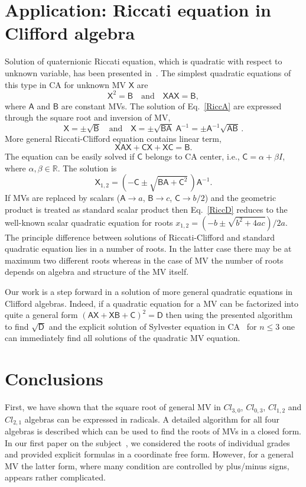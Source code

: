 \documentclass{birkjour}
\newcommand{\cl}[2]{\ensuremath{\mathit{Cl}_{#1,#2}}}
\newcommand{\bbR}{\ensuremath{\mathbb{R}}}
\def\A{\mathsf{A}}
\def\B{\mathsf{B}}
\def\C{\mathsf{C}}
\def\D{\mathsf{D}}
\def\X{\mathsf{X}}
\begin{document}
\section{Application: Riccati equation in Clifford algebra\label{sec:application}}
Solution of quaternionic Riccati equation, which is quadratic with
respect to unknown variable, has been presented
in~\cite{Janovska13}. The simplest quadratic equations of this
type in CA for unknown MV $\X$ are
\begin{equation}\label{RiccA}
\X^2=\B\quad\text{and}\quad\X\A\X=\B,
\end{equation}
where $\A$ and $\B$ are constant MVs. The solution of
Eq.~\eqref{RiccA} are expressed through the square root and
inversion of MV,
\begin{equation}\label{RiccB}
\X=\pm\sqrt{\B}\quad\text{and}\quad\X=\pm\sqrt{\B\A}\;\A^{-1}=\pm\A^{-1}\sqrt{\A\B}\,.
\end{equation}
More general Riccati-Clifford equation contains linear term,
\begin{equation}\label{RiccC}
\X\A\X+\C\X+\X\C=\B.
\end{equation}
The equation can be easily solved if $\C$ belongs to CA center,
i.e., $\C=\alpha+\beta I$, where $\alpha,\beta\in\bbR$. The
solution is~\cite{Dargys2019}
\begin{equation}\label{RiccD}
\X_{1,2}=(-\C\pm\sqrt{\B\A+\C^2}\,)\A^{-1}.
\end{equation}
If MVs are replaced by scalars ($\A\to a$, $\B\to c$, $\C\to b/2$)
and the geometric product is treated as standard scalar product
then Eq.~\eqref{RiccD} reduces to the well-known scalar quadratic
equation for roots $x_{1,2}=(-b\pm\sqrt{b^2+4ac})/2a$. The
principle difference between solutions of Riccati-Clifford and
standard quadratic equation lies in a number of roots. In the latter
case there may be at maximum two different roots whereas in the case
of MV the number of roots depends on algebra and structure of the
MV itself.

Our work is a step forward in a solution of  more general
quadratic equations in Clifford algebras. Indeed, if a quadratic
equation for a MV can be factorized into quite a general form $(\A
\X +\X\B +\C)^2=\D$ then using the presented algorithm to find
$\sqrt{\D}$ and the explicit solution of Sylvester equation in
CA~\cite{Dargys2018} for $n\le 3$ one can immediately find all
solutions of the quadratic MV equation.


\section{Conclusions\label{sec:conclusions}}
First, we have  shown that the  square root of general MV in
\cl{3}{0}, \cl{0}{3}, \cl{1}{2} and \cl{2}{1} algebras can be
expressed in radicals.  A detailed algorithm for all four algebras
is described which can be used to find the roots of MVs in a
closed form. In our first paper on the subject~\cite{Dargys2019},
we considered the roots of individual grades and provided explicit
formulas in a coordinate free form. However, for a general MV the
latter form, where many condition are controlled by plus/minus
signs, appears rather complicated.
\end{document}
